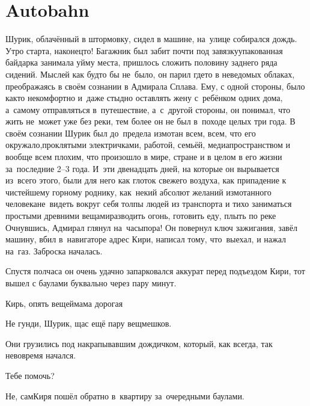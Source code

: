 \chapter{Autobahn}
\vepsianrose

Шурик, облачённый в штормовку, сидел в машине, на~улице собирался дождь. Утро старта, наконец\sdash то! Багажник был забит почти под завязку\mdash упакованная байдарка занимала уйму места, пришлось сложить половину заднего ряда сидений. Мыслей как будто бы не~было, он парил где\sdash то в неведомых облаках, преображаясь в своём сознании в Адмирала Сплава. Ему, с одной стороны, было как\sdash то некомфортно и~даже стыдно оставлять жену с~ребёнком одних дома, а~самому отправляться в~путешествие, а~с~другой стороны, он понимал, что жить не~может уже без реки, тем более он не был в~походе целых три года. В своём сознании Шурик был до~предела измотан всем, всем, что его окружало,\mdash проклятыми электричками, работой, семьёй, медиапространством и вообще всем плохим, что произошло в мире, стране и в целом в его жизни за~последние 2\nobreakdash--3 года. И~эти двенадцать дней, на которые он вырывается из~всего этого, были для него как глоток свежего воздуха, как припадение к чистейшему горному роднику, как~некий абсолют желаний измотанного человека\mdash не~видеть вокруг себя толпы людей из транспорта и тихо заниматься простыми древними вещами\mdash разводить огонь, готовить еду, плыть по реке\myldots{} Очнувшись, Адмирал глянул на~часы\mdash пора! Он повернул ключ зажигания, завёл машину, вбил в~навигаторе адрес Кири, написал тому, что~выехал, и нажал на~газ. Заброска началась.

Спустя полчаса он очень удачно запарковался аккурат перед подъездом Кири, тот вышел с баулами буквально через пару минут.

\diagdash Кирь, опять вещей\mdash мама дорогая\myldots{}


\diagdash Не гунди, Шурик, щас ещё пару вещмешков.

Они грузились под накрапывавшим дождичком, который, как всегда, так невовремя начался.

\diagdash Тебе помочь?

\diagdash Не, сам\myldots{}\mdash Киря пошёл обратно в~квартиру за~очередными баулами.

